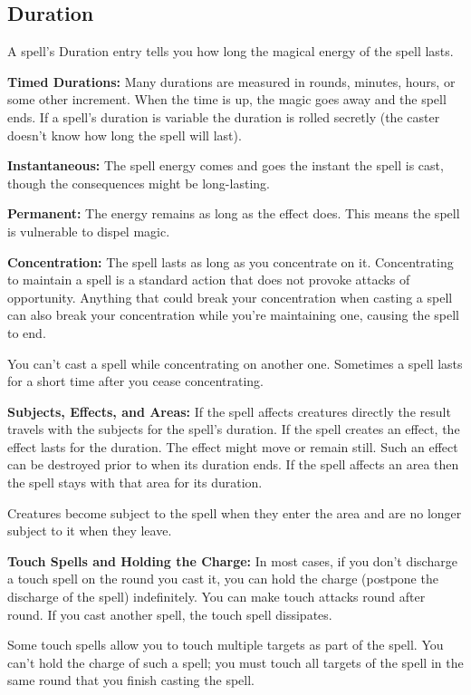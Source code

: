 \subsection{Duration}
A spell's Duration entry tells you how long the magical energy of the spell lasts.

\textbf{Timed Durations:} Many durations are measured in rounds, minutes, hours, or some other increment. When the time is up, the magic goes away and the spell ends. If a spell's duration is variable the duration is rolled secretly (the caster doesn't know how long the spell will last).

\textbf{Instantaneous:} The spell energy comes and goes the instant the spell is cast, though the consequences might be long-lasting.

\textbf{Permanent:} The energy remains as long as the effect does. This means the spell is vulnerable to dispel magic.

\textbf{Concentration:} The spell lasts as long as you concentrate on it. Concentrating to maintain a spell is a standard action that does not provoke attacks of opportunity. Anything that could break your concentration when casting a spell can also break your concentration while you're maintaining one, causing the spell to end.

You can't cast a spell while concentrating on another one. Sometimes a spell lasts for a short time after you cease concentrating.

\textbf{Subjects, Effects, and Areas:} If the spell affects creatures directly the result travels with the subjects for the spell's duration. If the spell creates an effect, the effect lasts for the duration. The effect might move or remain still. Such an effect can be destroyed prior to when its duration ends. If the spell affects an area then the spell stays with that area for its duration.

Creatures become subject to the spell when they enter the area and are no longer subject to it when they leave.

\textbf{Touch Spells and Holding the Charge:} In most cases, if you don't discharge a touch spell on the round you cast it, you can hold the charge (postpone the discharge of the spell) indefinitely. You can make touch attacks round after round. If you cast another spell, the touch spell dissipates.

Some touch spells allow you to touch multiple targets as part of the spell. You can't hold the charge of such a spell; you must touch all targets of the spell in the same round that you finish casting the spell.

